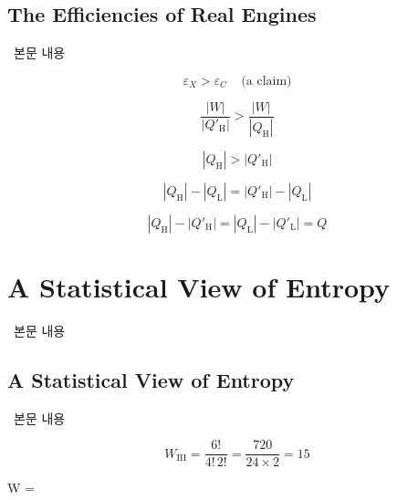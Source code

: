 \subsection{The Efficiencies of Real Engines}
%
\ 본문 내용

\begin{equation} \varepsilon_X > \varepsilon_C ~~~~~ \text{(a claim)} \end{equation}

\begin{equation*} \frac{ \left| W \right| }{ \left| Q'_{\mathrm{H}} \right| } > \frac{ \left| W \right| }{ \left| Q_{\mathrm{H}} \right| } \end{equation*}

\begin{equation} \left| Q_{\mathrm{H}} \right| > \left| Q'_{\mathrm{H}} \right| \end{equation}

\begin{equation*} \left| Q_{\mathrm{H}} \right| - \left| Q_{\mathrm{L}} \right| = \left| Q'_{\mathrm{H}} \right| - \left| Q_{\mathrm{L}} \right| \end{equation*}

\begin{equation} \left| Q_{\mathrm{H}} \right| - \left| Q'_{\mathrm{H}} \right| = \left| Q_{\mathrm{L}} \right| - \left| Q'_{\mathrm{L}} \right| = Q \end{equation}

\section{A Statistical View of Entropy}
%
\ 본문 내용

\subsection{A Statistical View of Entropy}
%
\ 본문 내용

\begin{equation*} W_{\text{III}} = \frac{6!}{4! \, 2!} = \frac{720}{24 \times 2} = 15 \end{equation*}

\begin{eqbox} W =  ~~~~~ 
\label{eq:multiplicity_of_configuration} \end{eqbox}

